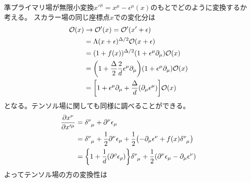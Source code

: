 \documentclass[../../master.tex]{subfiles}
\begin{document}
準プライマリ場が無限小変換\(x'^\mu = x^\mu -\epsilon^\mu(x)\)のもとでどのように変換するか考える。
スカラー場の同じ座標点\(x\)での変化分は
\begin{align}
    \mathcal{O}(x)
    &\rightarrow \mathcal{O}'(x) = \mathcal{O}'(x'+\epsilon)\notag\\
    &=\Lambda(x+\epsilon)^{\Delta/2}\mathcal{O}(x+\epsilon)\notag\\
    &=(1+f(x))^{\Delta/2}(1 + \epsilon^\mu\partial_\mu)\mathcal{O}(x)\notag\\
    &=\qty(1+\frac{\Delta}{2}\frac{2}{d}\epsilon^\mu\partial_\mu)(1 + \epsilon^\mu\partial_\mu)\mathcal{O}(x)\notag\\
    &=\qty[1+\epsilon^\mu\partial_\mu +\frac{\Delta}{d}(\partial_\mu\epsilon^\mu)]\mathcal{O}(x)
\end{align}
となる。テンソル場に関しても同様に調べることができる。
\begin{align}
    \pdv{x^\nu}{x'^\mu}
    &= \tensor{\delta}{^\nu_\mu} + \partial^\nu \epsilon_\mu \notag\\
    &= \tensor{\delta}{^\nu_\mu} + \frac{1}{2}\partial^\nu \epsilon_\mu
        + \frac{1}{2} \qty(-\partial_\mu \epsilon^\nu +f(x)\tensor{\delta}{^\nu_\mu})\notag\\
    &= \qty{1+\frac{1}{d}(\partial^\rho \epsilon_\rho)}\tensor{\delta}{^\nu_\mu} + \frac{1}{2}\qty(\partial^\nu \epsilon_\mu
    -\partial_\mu \epsilon^\nu)
\end{align}
よってテンソル場の方の変換性は
\end{document}
